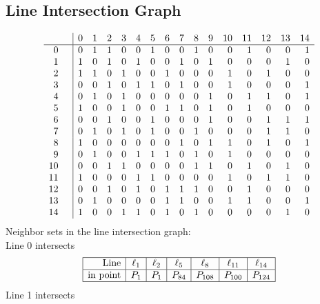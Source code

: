\documentclass{article}
\begin{document}
{\subsection*{Line Intersection Graph}
{\arraycolsep=1pt
$$
\begin{array}{rr|*{15}r}
 &  & 0 & 1 & 2 & 3 & 4 & 5 & 6 & 7 & 8 & 9 & 10 & 11 & 12 & 13 & 14\\
\hline
0 &  & 0 & 1 & 1 & 0 & 0 & 1 & 0 & 0 & 1 & 0 & 0 & 1 & 0 & 0 & 1\\
1 &  & 1 & 0 & 1 & 0 & 1 & 0 & 0 & 1 & 0 & 1 & 0 & 0 & 0 & 1 & 0\\
2 &  & 1 & 1 & 0 & 1 & 0 & 0 & 1 & 0 & 0 & 0 & 1 & 0 & 1 & 0 & 0\\
3 &  & 0 & 0 & 1 & 0 & 1 & 1 & 0 & 1 & 0 & 0 & 1 & 0 & 0 & 0 & 1\\
4 &  & 0 & 1 & 0 & 1 & 0 & 0 & 0 & 0 & 0 & 1 & 0 & 1 & 1 & 0 & 1\\
5 &  & 1 & 0 & 0 & 1 & 0 & 0 & 1 & 1 & 0 & 1 & 0 & 1 & 0 & 0 & 0\\
6 &  & 0 & 0 & 1 & 0 & 0 & 1 & 0 & 0 & 0 & 1 & 0 & 0 & 1 & 1 & 1\\
7 &  & 0 & 1 & 0 & 1 & 0 & 1 & 0 & 0 & 1 & 0 & 0 & 0 & 1 & 1 & 0\\
8 &  & 1 & 0 & 0 & 0 & 0 & 0 & 0 & 1 & 0 & 1 & 1 & 0 & 1 & 0 & 1\\
9 &  & 0 & 1 & 0 & 0 & 1 & 1 & 1 & 0 & 1 & 0 & 1 & 0 & 0 & 0 & 0\\
10 &  & 0 & 0 & 1 & 1 & 0 & 0 & 0 & 0 & 1 & 1 & 0 & 1 & 0 & 1 & 0\\
11 &  & 1 & 0 & 0 & 0 & 1 & 1 & 0 & 0 & 0 & 0 & 1 & 0 & 1 & 1 & 0\\
12 &  & 0 & 0 & 1 & 0 & 1 & 0 & 1 & 1 & 1 & 0 & 0 & 1 & 0 & 0 & 0\\
13 &  & 0 & 1 & 0 & 0 & 0 & 0 & 1 & 1 & 0 & 0 & 1 & 1 & 0 & 0 & 1\\
14 &  & 1 & 0 & 0 & 1 & 1 & 0 & 1 & 0 & 1 & 0 & 0 & 0 & 0 & 1 & 0\\
\end{array}
$$
}%
Neighbor sets in the line intersection graph:\\
Line 0 intersects 
$$
\begin{array}{|r*{6}{|c}|}
\hline
\mbox{Line}  & \ell_{1} & \ell_{2} & \ell_{5} & \ell_{8} & \ell_{11} & \ell_{14}\\
\hline
\mbox{in point}  & P_{1} & P_{1} & P_{84} & P_{108} & P_{100} & P_{124}\\
\hline
\end{array}
$$
Line 1 intersects 
$$
\begin{array}{|r*{6}{|c}|}

\end{array}$$}
\end{document}
